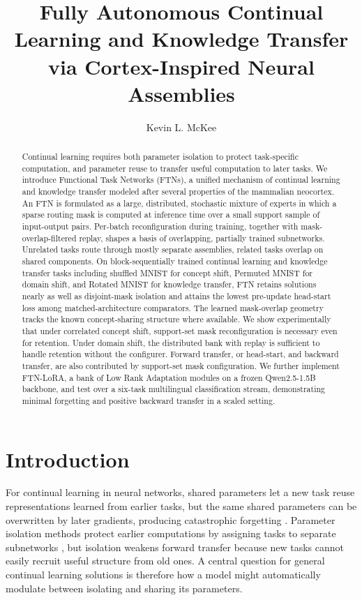 \documentclass[11pt]{article}
\title{Fully Autonomous Continual Learning and Knowledge Transfer\\ via Cortex-Inspired Neural Assemblies}
\author[1]{Kevin L. McKee}
\affil[1]{Astera Institute}
\date{}
\begin{document}
\maketitle

\begin{abstract}
Continual learning requires both parameter isolation to protect task-specific computation, and parameter reuse to transfer useful computation to later tasks. We introduce Functional Task Networks (FTNs), a unified mechanism of continual learning and knowledge transfer modeled after several properties of the mammalian neocortex. An FTN is formulated as a large, distributed, stochastic mixture of experts in which a sparse routing mask is computed at inference time over a small support sample of input-output pairs. Per-batch reconfiguration during training, together with mask-overlap-filtered replay, shapes a basis of overlapping, partially trained subnetworks. Unrelated tasks route through mostly separate assemblies, related tasks overlap on shared components. On block-sequentially trained continual learning and knowledge transfer tasks including shuffled MNIST for concept shift, Permuted MNIST for domain shift, and Rotated MNIST for knowledge transfer, FTN retains solutions nearly as well as disjoint-mask isolation and attains the lowest pre-update head-start loss among matched-architecture comparators. The learned mask-overlap geometry tracks the known concept-sharing structure where available. We show experimentally that under correlated concept shift, support-set mask reconfiguration is necessary even for retention. Under domain shift, the distributed bank with replay is sufficient to handle retention without the configurer. Forward transfer, or head-start, and backward transfer, are also contributed by support-set mask configuration. We further implement FTN-LoRA, a bank of Low Rank Adaptation modules on a frozen Qwen2.5-1.5B backbone, and test over a six-task multilingual classification stream, demonstrating minimal forgetting and positive backward transfer in a scaled setting.
\end{abstract}

\section{Introduction}\label{sec:intro}

For continual learning in neural networks, shared parameters let a new task reuse representations learned from earlier tasks, but the same shared parameters can be overwritten by later gradients, producing catastrophic forgetting \citep{mccloskey1989catastrophic,french1999catastrophic}. Parameter isolation methods protect earlier computations by assigning tasks to separate subnetworks \citep{mallya2018packnet,serra2018overcoming,wortsman2020supermasks}, but isolation weakens forward transfer because new tasks cannot easily recruit useful structure from old ones. A central question for general continual learning solutions is therefore how a model might automatically modulate between isolating and sharing its parameters.
\end{document}
